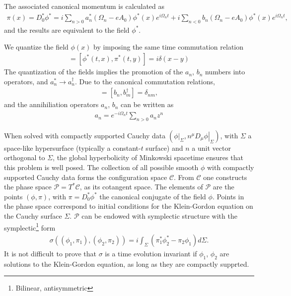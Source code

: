 The associated canonical momentum is calculated as
\begin{align}
	\pi(x) = D_0^*\phi^*= i\sum_{n>0}^{} a^*_n(\Omega_n - eA_0)\phi^*(x) e^{i\Omega_n t}
+ i\sum_{n<0}^{} b_n(\Omega_n - eA_0)\phi^*(x) e^{i\Omega_n t},
\end{align}
and the results are equivalent to the field $\phi^*$.

We quantize the field $\phi(x)$ by imposing the same time commutation relation  
\begin{align}
	[\phi(t, x), \pi(t, y)] = 
	[\phi^*(t, x), \pi^*(t, y)] = i \delta(x-y)
\end{align}
The quantization of the fields implies the promotion of the $a_n$, $b_n$ numbers into operators, and $a_n^*\to a_n^\dagger$. Due to the canonical commutation relations,
\begin{align}
	[a_n, a_m^\dagger] = [b_n, b_m^\dagger]= \delta_{nm},
\end{align}
and the annihiliation operators $a_n$, $b_n$ can be written as 
\begin{align}
	a_n = e^{-i\Omega_n t}\sum_{n>0}^{} a_n z^n
\end{align}


When solved with compactly supported Cauchy data $\left(\left. \phi\right|_\Sigma, \left. n^{\mu}D_\mu\phi \right|_\Sigma\right)$, with $\Sigma$ a space-like hypersurface (typically a constant-$t$ surface) and $n$ a unit vector orthogonal to $\Sigma$, the global hyperbolicity of Minkowski spacetime ensures that this problem is well posed.
		The collection of all possible smooth $\phi$ with compactly supported Cauchy data forms the configuration space $\mathcal{C}$. From $\mathcal{C}$ one constructs the phase space $\mathcal{P} = T^*\mathcal{C}$, as its cotangent space. The elements of $\mathcal{P}$ are the points $(\phi, \pi)$, with $\pi=D_0^*\phi^*$ the canonical conjugate of the field $\phi$. Points in the phase space correspond to initial conditions for the Klein-Gordon equation on the Cauchy surface $\Sigma.$
		$\mathcal{P}$ can be endowed with symplectic structure with the symplectic\footnote{Bilinear, antisymmetric} form
		\begin{align}
			\sigma((\phi_1, \pi_1), (\phi_2, \pi_2)) = i \int_\Sigma \left( \pi_1^* \phi_2^*- \pi_2\phi_1 \right) d\Sigma.
		\end{align}
		It is not difficult to prove that $\sigma$ is a time evolution invariant if $\phi_1$, $\phi_2$ are solutions to the Klein-Gordon equation, as long as they are compactly supprted. 
	
